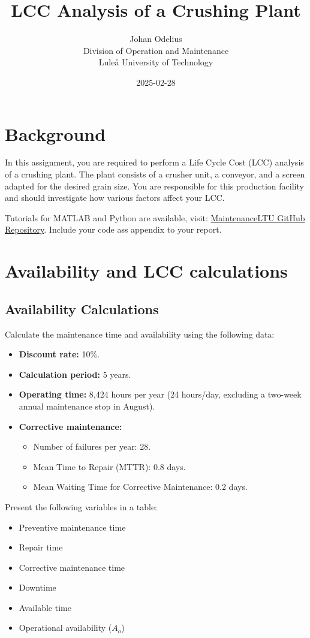 \documentclass[a4paper,12pt]{exam}
\title{LCC Analysis of a Crushing Plant}
\author{Johan Odelius \\
        Division of Operation and Maintenance \\
        Lule\aa{} University of Technology}
\date{2025-02-28}
\begin{document}
\maketitle

\section*{Background}
In this assignment, you are required to perform a Life Cycle Cost (LCC) analysis of a crushing plant. The plant consists of a crusher unit, a conveyor, and a screen adapted for the desired grain size. You are responsible for this production facility and should investigate how various factors affect your LCC.


Tutorials for MATLAB and Python are available, visit:  
\href{https://github.com/MaintenanceLTU/D0002B/tree/main/Maintenance%20Cost%20and%20LCC}{MaintenanceLTU GitHub Repository}. Include your code ass appendix to your report. 
\section{Availability and LCC calculations}
\subsection{Availability Calculations}
Calculate the maintenance time and availability using the following data:
\begin{itemize}
    \item \textbf{Discount rate:} 10\%.
    \item \textbf{Calculation period:} 5 years.
    \item \textbf{Operating time:} 8,424 hours per year (24 hours/day, excluding a two-week annual maintenance stop in August).
    \item \textbf{Corrective maintenance:}
    \begin{itemize}
        \item Number of failures per year: 28.
        \item Mean Time to Repair (MTTR): 0.8 days.
        \item Mean Waiting Time for Corrective Maintenance: 0.2 days.
    \end{itemize}
\end{itemize}
Present the following variables in a table: 
\begin{itemize}
    \item Preventive maintenance time
    \item Repair time
    \item Corrective maintenance time
    \item Downtime
    \item Available time
    \item Operational availability ($A_o$)
\end{itemize}
\end{document}
